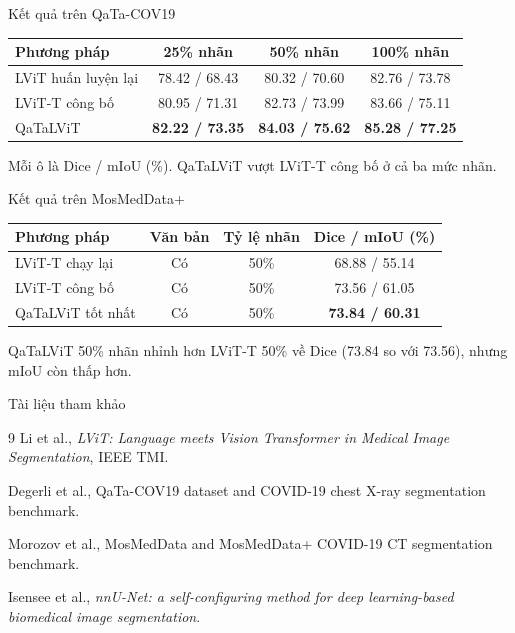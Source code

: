 \documentclass[aspectratio=169,11pt]{beamer}
\begin{document}
\begin{frame}{Kết quả trên QaTa-COV19}
  \centering
  \renewcommand{\arraystretch}{1.22}
  \begin{tabular}{lccc}
    \toprule
    Phương pháp & 25\% nhãn & 50\% nhãn & 100\% nhãn \\
    \midrule
    LViT huấn luyện lại & 78.42 / 68.43 & 80.32 / 70.60 & 82.76 / 73.78 \\
    LViT-T công bố & 80.95 / 71.31 & 82.73 / 73.99 & 83.66 / 75.11 \\
    QaTaLViT & \textbf{82.22 / 73.35} & \textbf{84.03 / 75.62} & \textbf{85.28 / 77.25} \\
    \bottomrule
  \end{tabular}

  \vspace{0.35cm}
  \small Mỗi ô là Dice / mIoU (\%). QaTaLViT vượt LViT-T công bố ở cả ba mức nhãn.
\end{frame}

\begin{frame}{Kết quả trên MosMedData+}
  \centering
  \renewcommand{\arraystretch}{1.22}
  \begin{tabular}{lccc}
    \toprule
    Phương pháp & Văn bản & Tỷ lệ nhãn & Dice / mIoU (\%) \\
    \midrule
    LViT-T chạy lại & Có & 50\% & 68.88 / 55.14 \\
    LViT-T công bố & Có & 50\% & 73.56 / 61.05 \\
    QaTaLViT tốt nhất & Có & 50\% & \textbf{73.84 / 60.31} \\
    \bottomrule
  \end{tabular}

  \vspace{0.25cm}
  \small QaTaLViT 50\% nhãn nhỉnh hơn LViT-T 50\% về Dice (73.84 so với 73.56), nhưng mIoU còn thấp hơn.

\end{frame}

\begin{frame}{Tài liệu tham khảo}
  \small
  \begin{thebibliography}{9}
    Li et al., \emph{LViT: Language meets Vision Transformer in Medical Image Segmentation}, IEEE TMI.

    Degerli et al., QaTa-COV19 dataset and COVID-19 chest X-ray segmentation benchmark.

    Morozov et al., MosMedData and MosMedData+ COVID-19 CT segmentation benchmark.

    Isensee et al., \emph{nnU-Net: a self-configuring method for deep learning-based biomedical image segmentation}.
  \end{thebibliography}
\end{frame}
\end{document}
